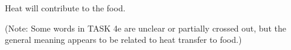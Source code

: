 Heat will contribute to the food.  

(Note: Some words in TASK 4e are unclear or partially crossed out, but the general meaning appears to be related to heat transfer to food.)